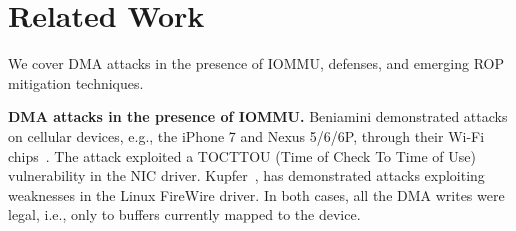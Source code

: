 \section{Related Work}
We cover DMA attacks in the presence of IOMMU, defenses, and emerging ROP mitigation techniques.

\smallskip
\noindent\textbf{DMA attacks in the presence of IOMMU.}
Beniamini demonstrated attacks on cellular devices, e.g., the iPhone 7 and Nexus 5/6/6P, through their Wi-Fi chips~\cite{Ben17a, Ben17b}. 
The attack exploited a TOCTTOU (Time of Check To Time of Use) vulnerability in the NIC driver. Kupfer~\cite{kupfer2018iommu}, has demonstrated \simple attacks exploiting weaknesses in the Linux FireWire driver. In both cases, all the DMA writes were legal, i.e., only to buffers currently mapped to the device.


